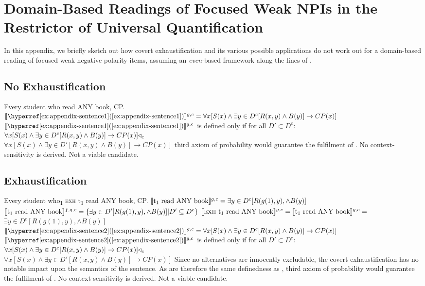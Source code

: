\chapter{Domain-Based Readings of Focused Weak NPIs in the Restrictor of Universal Quantification}
In this appendix, we briefly sketch out how covert exhaustification and its various possible applications do not work out for a domain-based reading of focused weak negative polarity items, assuming an \textit{even}-based framework along the lines of \citet{Crnic2011,Crnic2014-dogma,Crnic2014-nm}.
\section{No Exhaustification}
\pex[nopreamble=true]%
\a{} Every student who read \MakeUppercase{any} book, CP.
\a{} $\intension[g,c]{\refex{appendix-sentence1}}=\forall{x}[S(x)\land\exists{y\in D^c}[R(x,y)\land B(y)]\rightarrow CP(x)]$
\a{} $\intension[g,c]{\refex{appendix-sentence1}}$ is defined only if for all $D'\subset D^c$:\\$\forall{x}[S(x)\land\exists{y\in D^c}[R(x,y)\land B(y)]\rightarrow CP(x)]\lprob_c$\\\emptyfill$\forall{x}[S(x)\land\exists{y\in D'}[R(x,y)\land B(y)]\rightarrow CP(x)]$
\xe
{} third axiom of probability would guarantee the fulfilment of . No context-sensitivity is derived. Not a viable candidate.\pagebreak
\section{Exhaustification}
\pex[nopreamble=true]%
\a{} Every student who\textsubscript{1} {\scshape exh} t\textsubscript{1} read \MakeUppercase{any} book, CP.
\a{} $\intension[g,c]{t\textsubscript{1} read ANY book}=\exists{y\in D^c}[R(g(1),y),\land B(y)]$
\a{} $\intension[f,g,c]{t\textsubscript{1} read ANY book}=\{\exists{y\in D'}[R(g(1),y),\land B(y)]|D'\subseteq D^c\}$
\a{} $\intension[g,c]{{\scshape exh} t\textsubscript{1} read ANY book}=\intension[g,c]{t\textsubscript{1} read ANY book}=$\\\emptyfill$\exists{y\in D^c}[R(g(1),y),\land B(y)]$
\a{} $\intension[g,c]{\refex{appendix-sentence2}}=\forall{x}[S(x)\land\exists{y\in D^c}[R(x,y)\land B(y)]\rightarrow CP(x)]$
\a{} $\intension[g,c]{\refex{appendix-sentence2}}$ is defined only if for all $D'\subset D^c$:\\$\forall{x}[S(x)\land\exists{y\in D^c}[R(x,y)\land B(y)]\rightarrow CP(x)]\lprob_c$\\\emptyfill$\forall{x}[S(x)\land\exists{y\in D'}[R(x,y)\land B(y)]\rightarrow CP(x)]$
\xe
Since no alternatives are innocently excludable, the covert exhaustification has no notable impact upon the semantics of the sentence. As  are therefore the same definedness as ,  third axiom of probability would guarantee the fulfilment of . No context-sensitivity is derived. Not a viable candidate.
